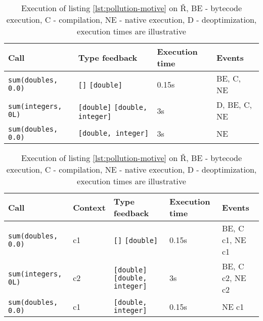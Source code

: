 \begin{table}
	\centering
	\begin{subtable}{\linewidth}
		\small
		\centering
		\begin{tabular}{|l l l l|}
			\hline
			\textbf{Call}              & \textbf{Type feedback}                                   & \textbf{Execution time} & \textbf{Events} \\
			\hline
			\texttt{sum(doubles, 0.0)} & \texttt{[]} \rightarrow \texttt{[double]}                & 0.15s                   & BE, C, NE       \\
			\texttt{sum(integers, 0L)} & \texttt{[double]} \rightarrow \texttt{[double, integer]} & 3s                      & D, BE, C, NE    \\
			\texttt{sum(doubles, 0.0)} & \texttt{[double, integer]}                               & 3s                      & NE              \\
			\hline
		\end{tabular}

		\label{tbl:pollution-motive-baseline}
	\end{subtable}

	\vspace{1em}

	\begin{subtable}{\linewidth}
		\small
		\centering
		\begin{tabular}{|l l l l l|}
			\hline
			\textbf{Call}              & \textbf{Context} & \textbf{Type feedback}                                   & \textbf{Execution time} & \textbf{Events} \\
			\hline
			\texttt{sum(doubles, 0.0)} & c1               & \texttt{[]} \rightarrow \texttt{[double]}                & 0.15s                   & BE, C c1, NE c1 \\
			\texttt{sum(integers, 0L)} & c2               & \texttt{[double]} \rightarrow \texttt{[double, integer]} & 3s                      & BE, C c2, NE c2 \\
			\texttt{sum(doubles, 0.0)} & c1               & \texttt{[double, integer]}                               & 0.15s                   & NE c1           \\
			\hline
		\end{tabular}

		\label{tbl:pollution-motive-context}
	\end{subtable}
	\caption{Execution of listing \ref{lst:pollution-motive} on Ř, BE - bytecode execution, C - compilation, NE - native execution, D - deoptimization, execution times are illustrative}
\end{table}

